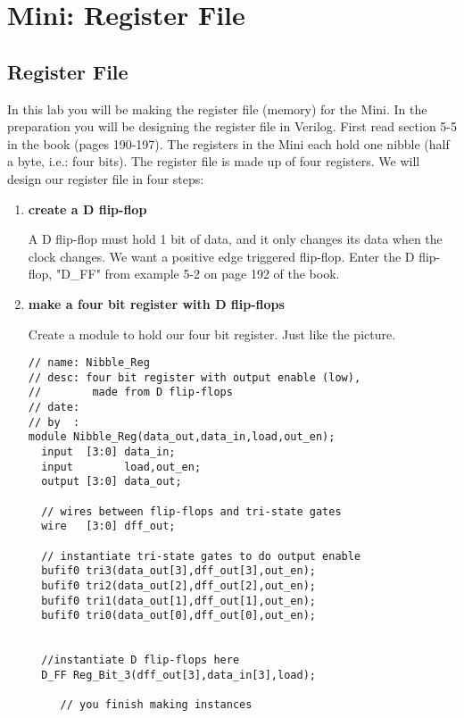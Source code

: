 \chapter{Mini: Register File}
\label{c-lab-reg}

\section{Register File}

In this lab you will be making the register file (memory) for the Mini. In the preparation you will be designing the register file in Verilog.  First read section 5-5 in the book (pages 190-197).  The registers in the Mini each hold one nibble (half a byte, i.e.: four bits).  The register file is made up of four registers.  We will design our register file in four steps:
\begin{enumerate}
\item \textbf{create a D flip-flop}

A D flip-flop must hold 1 bit of data, and it only changes its data when the clock changes.  We want a positive edge triggered flip-flop.  Enter the D flip-flop, "D\_FF" from example 5-2 on page 192 of the book.

\item \textbf{make a four bit register with D flip-flops}

\begin{floatingfigure}{1in}
\FourBitRegister
\end{floatingfigure}

  Create a module to hold our four bit register.  Just like the picture.

\begin{verbatim}
// name: Nibble_Reg
// desc: four bit register with output enable (low),
//        made from D flip-flops
// date:
// by  :
module Nibble_Reg(data_out,data_in,load,out_en);
  input  [3:0] data_in;
  input        load,out_en;
  output [3:0] data_out;

  // wires between flip-flops and tri-state gates
  wire   [3:0] dff_out;

  // instantiate tri-state gates to do output enable
  bufif0 tri3(data_out[3],dff_out[3],out_en);
  bufif0 tri2(data_out[2],dff_out[2],out_en);
  bufif0 tri1(data_out[1],dff_out[1],out_en);
  bufif0 tri0(data_out[0],dff_out[0],out_en);


  //instantiate D flip-flops here
  D_FF Reg_Bit_3(dff_out[3],data_in[3],load);

     // you finish making instances


\end{verbatim}
\end{enumerate}
